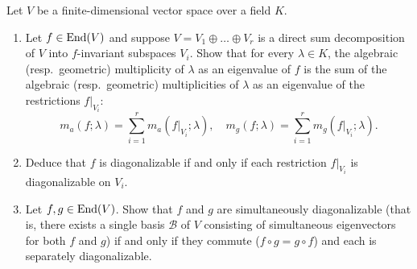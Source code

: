 \begin{exercise}
  \label{exc:direct_sum_multiplicities_and_simultaneous_diagonalizability}
  Let $V$ be a finite-dimensional vector space over a field $K$.
  \begin{enumerate}[label=\textbf{(\alph*)}]
    \item Let $f \in \operatorname{End}(V)$ and suppose $V = V_1 \oplus \dots \oplus V_r$ is a direct sum decomposition of $V$ into $f$-invariant subspaces $V_i$. Show that for every $\lambda \in K$, the algebraic (resp.\ geometric) multiplicity of $\lambda$ as an eigenvalue of $f$ is the sum of the algebraic (resp.\ geometric) multiplicities of $\lambda$ as an eigenvalue of the restrictions $f|_{V_i}$:
    \[
    m_a(f; \lambda) = \sum_{i=1}^r m_a(f|_{V_i}; \lambda), \quad m_g(f; \lambda) = \sum_{i=1}^r m_g(f|_{V_i}; \lambda).
    \]
    \item Deduce that $f$ is diagonalizable if and only if each restriction $f|_{V_i}$ is diagonalizable on $V_i$.
    \item Let $f, g \in \operatorname{End}(V)$. Show that $f$ and $g$ are simultaneously diagonalizable (that is, there exists a single basis $\mathcal{B}$ of $V$ consisting of simultaneous eigenvectors for both $f$ and $g$) if and only if they commute ($f \circ g = g \circ f$) and each is separately diagonalizable.
  \end{enumerate}
\end{exercise}

